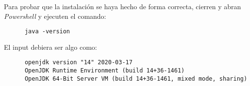     Para probar que la instalación se haya hecho de forma correcta, cierren y abran 
    \textit{Powershell} y ejecuten el comando:

    \begin{verbatim}
      java -version
    \end{verbatim}

    El input debiera ser algo como:

    \begin{verbatim}
      openjdk version "14" 2020-03-17
      OpenJDK Runtime Environment (build 14+36-1461)
      OpenJDK 64-Bit Server VM (build 14+36-1461, mixed mode, sharing)
    \end{verbatim}
%